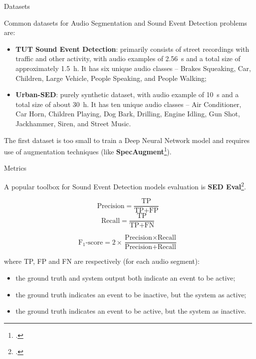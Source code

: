 	\begin{frame}{Datasets}
	
		Common datasets for Audio Segmentation and Sound Event Detection problems are:
		
		\begin{itemize}
			\item \textbf{TUT Sound Event Detection}: primarily consists of street recordings with traffic and other activity, with audio examples of \SI{2.56}{\second} and a total size of approximately \SI{1.5}{\hour}. It has six unique audio classes -- Brakes Squeaking, Car, Children, Large Vehicle, People Speaking, and People Walking;
			\item \textbf{Urban-SED}: purely synthetic dataset, with audio example of \SI{10}{\second} and a total size of about \SI{30}{\hour}. It has ten unique audio classes -- Air Conditioner, Car Horn, Children Playing, Dog Bark, Drilling, Engine Idling, Gun Shot, Jackhammer, Siren, and Street Music.
		\end{itemize}
		
		The first dataset is too small to train a Deep Neural Network model and requires use of augmentation techniques (like \textbf{SpecAugment}\footcite{park19e_interspeech}).

	\end{frame}
	
	\begin{frame}{Metrics}
	
		A popular toolbox for Sound Event Detection models evaluation is \textbf{SED Eval}\footcite{app6060162}.\vspace{-3em}
		\begin{multicols}{2}
  			\begin{equation*}
    			\text{Precision} = \frac{\text{TP}}{\text{TP} + \text{FP}}
  			\end{equation*}\break
  			\begin{equation*}
    			\text{Recall} = \frac{\text{TP}}{\text{TP} + \text{FN}}
  			\end{equation*}
		\end{multicols}
		\vspace{-1em}
		\begin{equation*}
			\text{F$_{1}$-score} = 2 \times \frac{\text{Precision} \times \text{Recall}}{\text{Precision} + \text{Recall}}
		\end{equation*}
		
		where TP, FP and FN are respectively (for each audio segment):
		\begin{itemize}
			\item the ground truth and system output both indicate an event to be active;
			\item the ground truth indicates an event to be inactive, but the system as active;
			\item the ground truth indicates an event to be active, but the system as inactive.
		\end{itemize}
		
	\end{frame}